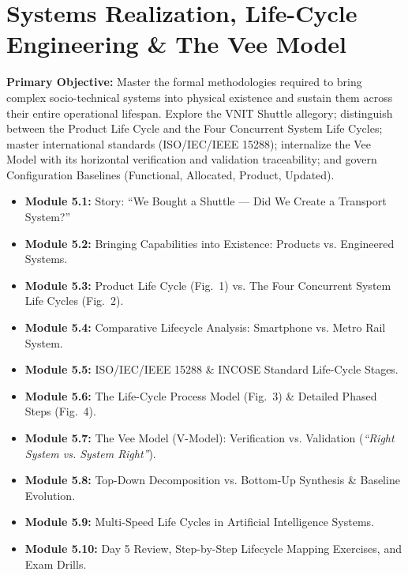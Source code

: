 \chapter{Systems Realization, Life-Cycle Engineering \& The Vee Model}
\label{chap:day5}

\begin{tcolorbox}[colback=sePrimary!5!white,colframe=sePrimary,title={\sffamily \textbf{DAY 5 CURRICULUM OVERVIEW \& LEARNING TARGETS}}]
\small
\textbf{Primary Objective:} Master the formal methodologies required to bring complex socio-technical systems into physical existence and sustain them across their entire operational lifespan. Explore the VNIT Shuttle allegory; distinguish between the Product Life Cycle and the Four Concurrent System Life Cycles; master international standards (ISO/IEC/IEEE 15288); internalize the Vee Model with its horizontal verification and validation traceability; and govern Configuration Baselines (Functional, Allocated, Product, Updated).
\begin{itemize}[leftmargin=1.5em, itemsep=2pt]
    \item \textbf{Module 5.1:} Story: ``We Bought a Shuttle --- Did We Create a Transport System?''
    \item \textbf{Module 5.2:} Bringing Capabilities into Existence: Products vs. Engineered Systems.
    \item \textbf{Module 5.3:} Product Life Cycle (Fig.~1) vs. The Four Concurrent System Life Cycles (Fig.~2).
    \item \textbf{Module 5.4:} Comparative Lifecycle Analysis: Smartphone vs. Metro Rail System.
    \item \textbf{Module 5.5:} ISO/IEC/IEEE 15288 \& INCOSE Standard Life-Cycle Stages.
    \item \textbf{Module 5.6:} The Life-Cycle Process Model (Fig.~3) \& Detailed Phased Steps (Fig.~4).
    \item \textbf{Module 5.7:} The Vee Model (V-Model): Verification vs. Validation (\textit{``Right System vs. System Right''}).
    \item \textbf{Module 5.8:} Top-Down Decomposition vs. Bottom-Up Synthesis \& Baseline Evolution.
    \item \textbf{Module 5.9:} Multi-Speed Life Cycles in Artificial Intelligence Systems.
    \item \textbf{Module 5.10:} Day 5 Review, Step-by-Step Lifecycle Mapping Exercises, and Exam Drills.
\end{itemize}
\end{tcolorbox}

